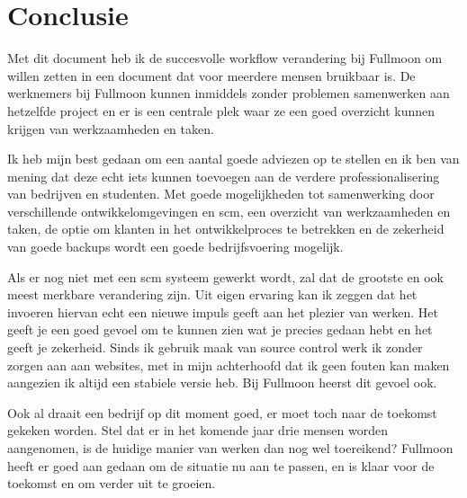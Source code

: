\chapter{Conclusie}

Met dit document heb ik de succesvolle workflow verandering bij Fullmoon om willen zetten in een document dat voor meerdere mensen bruikbaar is. De werknemers bij Fullmoon kunnen inmiddels zonder problemen samenwerken aan hetzelfde project en er is een centrale plek waar ze een goed overzicht kunnen krijgen van werkzaamheden en taken.

Ik heb mijn best gedaan om een aantal goede adviezen op te stellen en ik ben van mening dat deze echt iets kunnen toevoegen aan de verdere professionalisering van bedrijven en studenten. Met goede mogelijkheden tot samenwerking door verschillende ontwikkelomgevingen en {\sc scm}, een overzicht van werkzaamheden en taken, de optie om klanten in het ontwikkelproces te betrekken en de zekerheid van goede backups wordt een goede bedrijfsvoering mogelijk.

Als er nog niet met een {\sc scm} systeem gewerkt wordt, zal dat de grootste en ook meest merkbare verandering zijn. Uit eigen ervaring kan ik zeggen dat het invoeren hiervan echt een nieuwe impuls geeft aan het plezier van werken. Het geeft je een goed gevoel om te kunnen zien wat je precies gedaan hebt en het geeft je zekerheid. Sinds ik gebruik maak van source control werk ik zonder zorgen aan aan websites, met in mijn achterhoofd dat ik geen fouten kan maken aangezien ik altijd een stabiele versie heb. Bij Fullmoon heerst dit gevoel ook.

Ook al draait een bedrijf op dit moment goed, er moet toch naar de toekomst gekeken worden. Stel dat er in het komende jaar drie mensen worden aangenomen, is de huidige manier van werken dan nog wel toereikend? Fullmoon heeft er goed aan gedaan om de situatie nu aan te passen, en is klaar voor de toekomst en om verder uit te groeien.
